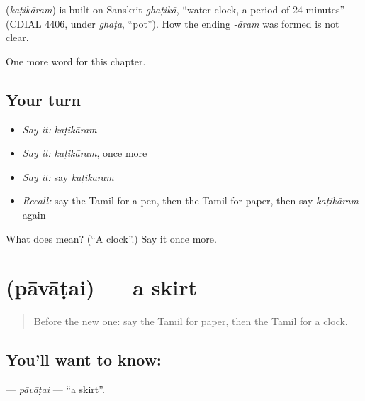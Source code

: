 \begin{cousinweb}
\textbf{} (\emph{kaṭikāram}) is built on Sanskrit \emph{ghaṭikā}, \textquotedblleft{}water-clock, a period of 24 minutes\textquotedblright{} (CDIAL 4406, under \emph{ghaṭa}, \textquotedblleft{}pot\textquotedblright{}). How the ending \emph{-āram} was formed is not clear.
\end{cousinweb}

\begin{grammarlens}[title={What you've built}]
One more word for this chapter.
\end{grammarlens}

\subsection*{Your turn}
\begin{itemize}
\raggedright
  \item \emph{Say it:} \emph{kaṭikāram}
  \item \emph{Say it:} \emph{kaṭikāram}, once more
  \item \emph{Say it:} say \emph{kaṭikāram}
  \item \emph{Recall:} say the Tamil for a pen, then the Tamil for paper, then say \emph{kaṭikāram} again
\end{itemize}

\begin{tcolorbox}[breakable,colback=teal!4,colframe=teal!35!black,title={Before you move on}]
What does  mean? (\textquotedblleft{}A clock\textquotedblright{}.) Say it once more.
\end{tcolorbox}
\section[\texorpdfstring{\ta{பாவாடை} (pāvāṭai)}{பாவாடை (pāvāṭai)}]{ (pāvāṭai) — a skirt}

\label{lesson:TA-C121-pavatai}



\begin{quote}
Before the new one: say the Tamil for paper, then the Tamil for a clock.
\end{quote}

\subsection*{You'll want to know: }
\textbf{} — \emph{pāvāṭai} — \textquotedblleft{}a skirt\textquotedblright{}.

